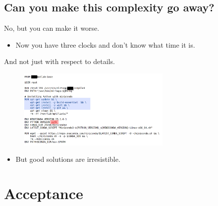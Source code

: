 		\subsection{Can you make this complexity go away?}
			\begin{frame}{No, but you can make it worse.}
				\begin{figure}
					\centering
				\end{figure}
				\vspace{-2.5em}
				\begin{itemize}
					\item Now you have three clocks and don't know what time it is.
				\end{itemize}
			\end{frame}
			\begin{frame}{And not just with respect to details.}
				\vspace{-.5em}
				\begin{figure}
					\captionsetup{justification=centering}
					\centering
						\includegraphics[width=0.66\textwidth]{img/py39.png}
				\end{figure}
				\vspace{-1em}
				\begin{itemize}
					\item \textcolor{lb}{But good solutions are irresistible.}
				\end{itemize}
			\end{frame}
	\section{Acceptance}
